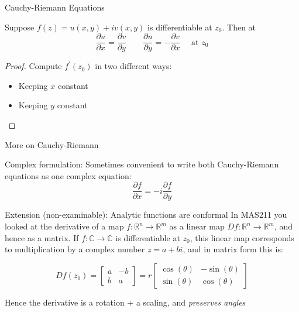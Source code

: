 \documentclass{beamer}
\newcommand{\C}{\mathbb{C}}
\newcommand{\R}{\mathbb{R}}
\begin{document}
\begin{frame}{Cauchy-Riemann Equations}

\begin{theorem}
Suppose $f(z)=u(x,y)+iv(x,y)$ is differentiable at $z_0$.  Then at 
$$\frac{\partial u}{\partial x}=\frac{\partial v}{\partial y}\quad\quad\frac{\partial u}{\partial y}=-\frac{\partial v}{\partial x}\quad \text{ at } z_0$$
\end{theorem}

\begin{proof}
Compute $f^\prime(z_0)$ in two different ways:
\begin{itemize}
    \item Keeping $x$ constant
    \item Keeping $y$ constant
\end{itemize}
\end{proof}

\end{frame}


\begin{frame}{More on Cauchy-Riemann}
\begin{block}{Complex formulation:}
Sometimes convenient to write both Cauchy-Riemann equations as one complex equation:
$$\frac{\partial f}{\partial x} = -i \frac{\partial f}{\partial y}$$
\end{block}


\begin{block}{Extension (non-examinable): Analytic functions are conformal}
In MAS211 you looked at the derivative of a map $f:\R^n\to\R^m$ as a linear map $Df:\R^n\to\R^m$, and hence as a matrix.  If $f:\C\to\C$ is differentiable at $z_0$, this linear map corresponds to multiplication by a complex number $z=a+bi$, and in matrix form this is:\newline

$$Df(z_0)=\begin{bmatrix} a & -b \\ b & a \end{bmatrix}=r\begin{bmatrix} \cos(\theta) & -\sin(\theta) \\ \sin(\theta) & \cos(\theta)\end{bmatrix}$$

Hence the derivative is a rotation + a scaling, and \emph{preserves angles}
\end{block}


\end{frame}
\end{document}
